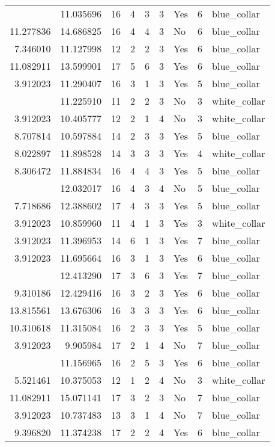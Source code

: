 \documentclass[
]{article}
\begin{document}
\begin{longtable}[t]{rrrrrllrl}
\addlinespace
7.718686 & 11.035696 & 16 & 4 & 3 & 3 & Yes & 6 & blue\_collar\\
11.277836 & 14.686825 & 16 & 4 & 4 & 3 & No & 6 & blue\_collar\\
7.346010 & 11.127998 & 12 & 2 & 2 & 3 & Yes & 6 & blue\_collar\\
11.082911 & 13.599901 & 17 & 5 & 6 & 3 & Yes & 6 & blue\_collar\\
3.912023 & 11.290407 & 16 & 3 & 1 & 3 & Yes & 5 & blue\_collar\\
\addlinespace
6.956545 & 11.225910 & 11 & 2 & 2 & 3 & No & 3 & white\_collar\\
3.912023 & 10.405777 & 12 & 2 & 1 & 4 & No & 3 & white\_collar\\
8.707814 & 10.597884 & 14 & 2 & 3 & 3 & Yes & 5 & blue\_collar\\
8.022897 & 11.898528 & 14 & 3 & 3 & 3 & Yes & 4 & white\_collar\\
8.306472 & 11.884834 & 16 & 4 & 4 & 3 & Yes & 5 & blue\_collar\\
\addlinespace
6.672033 & 12.032017 & 16 & 4 & 3 & 4 & No & 5 & blue\_collar\\
7.718686 & 12.388602 & 17 & 4 & 3 & 3 & Yes & 5 & blue\_collar\\
3.912023 & 10.859960 & 11 & 4 & 1 & 3 & Yes & 3 & white\_collar\\
3.912023 & 11.396953 & 14 & 6 & 1 & 3 & Yes & 7 & blue\_collar\\
3.912023 & 11.695664 & 16 & 3 & 1 & 3 & Yes & 6 & blue\_collar\\
\addlinespace
9.905984 & 12.413290 & 17 & 3 & 6 & 3 & Yes & 7 & blue\_collar\\
9.310186 & 12.429416 & 16 & 3 & 2 & 3 & Yes & 6 & blue\_collar\\
13.815561 & 13.676306 & 16 & 3 & 3 & 3 & Yes & 6 & blue\_collar\\
10.310618 & 11.315084 & 16 & 2 & 3 & 3 & Yes & 5 & blue\_collar\\
3.912023 & 9.905984 & 17 & 2 & 1 & 4 & No & 7 & blue\_collar\\
\addlinespace
9.396820 & 11.156965 & 16 & 2 & 5 & 3 & Yes & 6 & blue\_collar\\
5.521461 & 10.375053 & 12 & 1 & 2 & 4 & No & 3 & white\_collar\\
11.082911 & 15.071141 & 17 & 3 & 2 & 3 & No & 7 & blue\_collar\\
3.912023 & 10.737483 & 13 & 3 & 1 & 4 & No & 7 & blue\_collar\\
9.396820 & 11.374238 & 17 & 2 & 2 & 4 & Yes & 6 & blue\_collar\\

\end{longtable}
\end{document}
